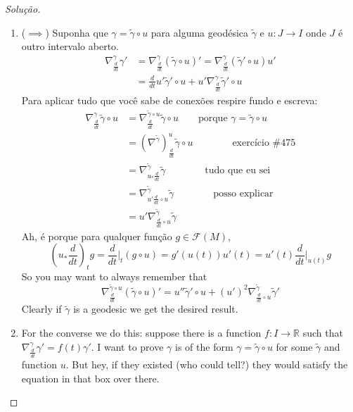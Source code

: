 \begin{proof}[Solução]\leavevmode
\begin{enumerate}[label=(\alph*)]
\item (\(\implies\)) Suponha que \(\gamma=\tilde{\gamma} \circ u\) para alguma geodésica \(\tilde{\gamma}\) e \(u:J \to I\) onde \(J\) é outro intervalo aberto.
	\begin{align*}
	\nabla_{\frac{d}{dt}}^\gamma \gamma'&=\nabla^\gamma_{\frac{d}{dt}}(\tilde{\gamma}\circ u)'=\nabla^\gamma_{\frac{d}{dt}}(\tilde{\gamma}'\circ u)u'\\
	&=\frac{d}{dt}u' \tilde{\gamma}'\circ u+u'\nabla^\gamma_{\frac{d}{dt}}\tilde{\gamma}' \circ u
	\end{align*}
	Para aplicar tudo que você sabe de conexões respire fundo e escreva:
	\begin{align*}
	\nabla^\gamma_{\frac{d}{dt}}\tilde{\gamma} \circ u&=\nabla^{\tilde{\gamma}\circ u}_{\frac{d}{dt}}\tilde{\gamma}\circ u\qquad \text{porque \(\gamma=\tilde{\gamma}\circ u\)} \\
	&=(\nabla^{\tilde{\gamma}})^u_{\frac{d}{dt}}\tilde{\gamma}\circ u\qquad\qquad  \text{exercício \#475}\\
	&=\nabla^{\tilde{\gamma}}_{u_*\frac{d}{dt}}\tilde{\gamma}\qquad\qquad  \text{tudo que eu sei} \\
	&=\nabla^{\tilde{\gamma}}_{u'\frac{d}{dt}\circ u}\tilde{\gamma}\qquad\qquad  \text{posso explicar}\\
	&=u'\nabla^{\tilde{\gamma}}_{\frac{d}{dt}\circ u}\tilde{\gamma}
	\end{align*}
	Ah, é porque para qualquer função \(g \in \mathcal{F}(M)\),
	\[\left(u_* \frac{d}{dt}\right)_tg=\frac{d}{dt}\Big|_{t}(g \circ u)=g'(u(t))u'(t)=u'(t) \frac{d}{dt}\Big|_{u(t)}g\]
	So you may want to always remember that
\[\boxed{\nabla^{\tilde{\gamma}\circ u}_{\frac{d}{dt}}(\tilde{\gamma}\circ u)'=u''\tilde{\gamma}'\circ u+(u')^2\nabla^{\tilde{\gamma}}_{\frac{d}{dt}\circ u}\tilde{\gamma}'}\]
Clearly if \(\tilde{\gamma}\) is a geodesic we get the desired result.

\item For the converse we do this: suppose there is a function \(f:I \to \mathbb{R}\) such that \(\nabla^\gamma_{\frac{d}{dt}}\gamma'=f(t)\gamma'\). I want to prove \(\gamma\) is of the form \(\gamma=\tilde{\gamma}\circ u\) for some \(\tilde{\gamma}\) and function \(u\). But hey, if they existed (who could tell?) they would satisfy the equation in that box over there.
\end{enumerate}
\end{proof}

